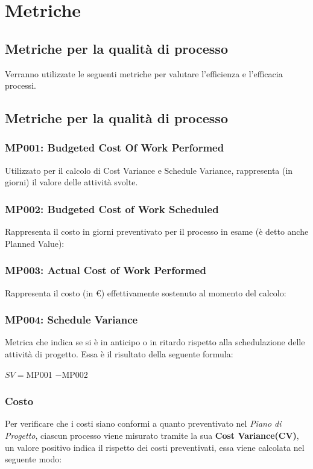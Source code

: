 \chapter{Metriche}
\label{metriche}
\section{Metriche per la qualità di processo}
Verranno utilizzate le seguenti metriche per valutare l'efficienza e l'efficacia 
processi.
\section{Metriche per la qualità di processo}
\subsection{MP001: Budgeted Cost Of Work Performed}\label{bcwp}
Utilizzato per il calcolo di Cost Variance e Schedule Variance, rappresenta (in giorni) il valore delle attività svolte.

\subsection{MP002: Budgeted Cost of Work Scheduled}\label{bcws}
Rappresenta il costo in giorni preventivato per il processo in esame (è detto anche Planned Value):


\subsection{MP003: Actual Cost of Work Performed}\label{acwp}
Rappresenta il costo (in \euro) effettivamente sostenuto al momento del calcolo:

\subsection{MP004: Schedule Variance}
Metrica che indica se si è in anticipo o in ritardo rispetto alla schedulazione delle attività di progetto.
Essa è il risultato della seguente formula:\\
\begin{center}
	
	$SV = ${MP001} $-${MP002}
	
\end{center}

\subsection{Costo}
Per verificare che i costi siano conformi a quanto preventivato nel \textit{Piano di Progetto}, ciascun processo viene misurato tramite la sua \textbf{Cost Variance(CV)}, un valore positivo indica il rispetto dei costi preventivati, essa viene calcolata nel seguente modo:\\ 
